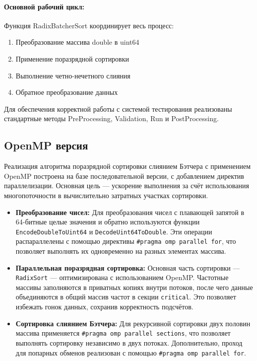 \documentclass[12pt]{article}
\begin{document}
\paragraph{Основной рабочий цикл:}
Функция RadixBatcherSort координирует весь процесс:
\begin{enumerate}
	\item Преобразование массива double в uint64
	\item Применение поразрядной сортировки
	\item Выполнение четно-нечетного слияния
	\item Обратное преобразование данных
\end{enumerate}
Для обеспечения корректной работы с системой тестирования реализованы стандартные методы PreProcessing, Validation, Run и PostProcessing.

\subsection{OpenMP версия}

Реализация алгоритма поразрядной сортировки слиянием Бэтчера с применением OpenMP построена на базе последовательной версии, с добавлением директив параллелизации. Основная цель — ускорение выполнения за счёт использования многопоточности в вычислительно затратных участках сортировки.

\begin{itemize}
  \item \textbf{Преобразование чисел:}  
  Для преобразования чисел с плавающей запятой в 64-битные целые значения и обратно используются функции \texttt{EncodeDoubleToUint64} и \texttt{DecodeUint64ToDouble}. Эти операции распараллелены с помощью директивы \texttt{\#pragma omp parallel for}, что позволяет выполнять их одновременно на разных элементах массива.

  \item \textbf{Параллельная поразрядная сортировка:}  
  Основная часть сортировки — \texttt{RadixSort} — оптимизирована с использованием OpenMP. Частотные массивы заполняются в приватных копиях внутри потоков, после чего данные объединяются в общий массив частот в секции \texttt{critical}. Это позволяет избежать гонок данных, сохранив корректность подсчётов.

  \item \textbf{Сортировка слиянием Бэтчера:}  
  Для рекурсивной сортировки двух половин массива применяется \texttt{\#pragma omp parallel sections}, что позволяет выполнять сортировку независимо в двух потоках. Дополнительно, проход для попарных обменов реализован с помощью \texttt{\#pragma omp parallel for}.
\end{itemize}
\end{document}
